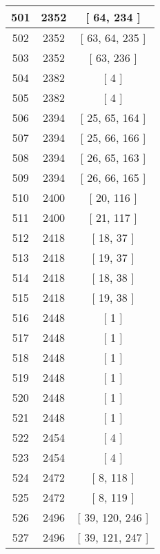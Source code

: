 \begin{center}
\begin{longtable}[H]{|| c c c ||}
\hline
501 & 2352 & [ 64, 234 ] \\ 
\hline
502 & 2352 & [ 63, 64, 235 ] \\ 
\hline
503 & 2352 & [ 63, 236 ] \\ 
\hline
504 & 2382 & [ 4 ] \\ 
\hline
505 & 2382 & [ 4 ] \\ 
\hline
506 & 2394 & [ 25, 65, 164 ] \\ 
\hline
507 & 2394 & [ 25, 66, 166 ] \\ 
\hline
508 & 2394 & [ 26, 65, 163 ] \\ 
\hline
509 & 2394 & [ 26, 66, 165 ] \\ 
\hline
510 & 2400 & [ 20, 116 ] \\ 
\hline
511 & 2400 & [ 21, 117 ] \\ 
\hline
512 & 2418 & [ 18, 37 ] \\ 
\hline
513 & 2418 & [ 19, 37 ] \\ 
\hline
514 & 2418 & [ 18, 38 ] \\ 
\hline
515 & 2418 & [ 19, 38 ] \\ 
\hline
516 & 2448 & [ 1 ] \\ 
\hline
517 & 2448 & [ 1 ] \\ 
\hline
518 & 2448 & [ 1 ] \\ 
\hline
519 & 2448 & [ 1 ] \\ 
\hline
520 & 2448 & [ 1 ] \\ 
\hline
521 & 2448 & [ 1 ] \\ 
\hline
522 & 2454 & [ 4 ] \\ 
\hline
523 & 2454 & [ 4 ] \\ 
\hline
524 & 2472 & [ 8, 118 ] \\ 
\hline
525 & 2472 & [ 8, 119 ] \\ 
\hline
526 & 2496 & [ 39, 120, 246 ] \\ 
\hline
527 & 2496 & [ 39, 121, 247 ] \\ 
\hline
\end{longtable}
\end{center}
